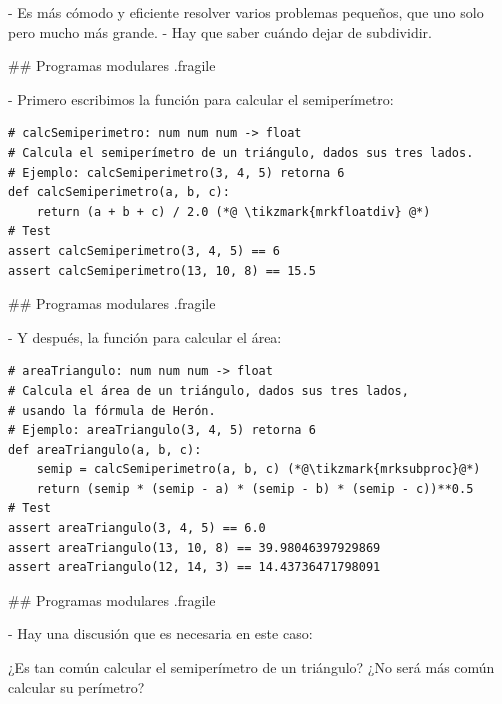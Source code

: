 - Es más cómodo y eficiente resolver varios problemas pequeños, que uno solo pero mucho más grande.
- Hay que saber cuándo dejar de subdividir.


## Programas modulares {.fragile}


- Primero escribimos la función para calcular el semiperímetro:

\begin{lstlisting}[style=frame02]
# calcSemiperimetro: num num num -> float
# Calcula el semiperímetro de un triángulo, dados sus tres lados.
# Ejemplo: calcSemiperimetro(3, 4, 5) retorna 6
def calcSemiperimetro(a, b, c):
    return (a + b + c) / 2.0 (*@ \tikzmark{mrkfloatdiv} @*)
# Test
assert calcSemiperimetro(3, 4, 5) == 6
assert calcSemiperimetro(13, 10, 8) == 15.5
\end{lstlisting}

\pause


## Programas modulares {.fragile}


- Y después, la función para calcular el área:

\begin{lstlisting}[style=frame02]
# areaTriangulo: num num num -> float
# Calcula el área de un triángulo, dados sus tres lados,
# usando la fórmula de Herón.
# Ejemplo: areaTriangulo(3, 4, 5) retorna 6
def areaTriangulo(a, b, c):
    semip = calcSemiperimetro(a, b, c) (*@\tikzmark{mrksubproc}@*)
    return (semip * (semip - a) * (semip - b) * (semip - c))**0.5
# Test
assert areaTriangulo(3, 4, 5) == 6.0
assert areaTriangulo(13, 10, 8) == 39.98046397929869
assert areaTriangulo(12, 14, 3) == 14.43736471798091
\end{lstlisting}

\pause


## Programas modulares {.fragile}


- Hay una discusión que es necesaria en este caso:

\bgnblocknormal
¿Es tan común calcular el semiperímetro de un triángulo?  \newline
¿No será más común calcular su perímetro?
\trmblocknormal

